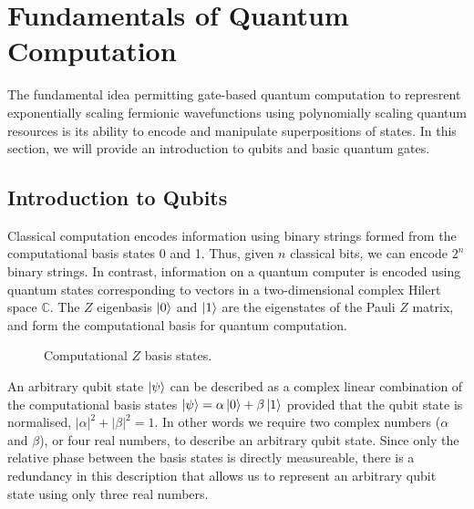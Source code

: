 \section{Fundamentals of Quantum Computation}%
\label{quantum-computation}

The fundamental idea permitting gate-based quantum computation to represrent exponentially scaling fermionic wavefunctions using polynomially scaling quantum resources is its ability to encode and manipulate superpositions of states. In this section, we will provide an introduction to qubits and basic quantum gates.

\subsection{Introduction to Qubits}

Classical computation encodes information using binary strings formed from the computational basis states 0 and 1. Thus, given $n$ classical bits, we can encode $2^n$ binary strings. In contrast, information on a quantum computer is encoded using quantum states corresponding to vectors in a two-dimensional complex Hilert space $\mathbb{C}$. The $Z$ eigenbasis $\ket 0$ and $\ket 1$ are the eigenstates of the Pauli $Z$ matrix, and form the computational basis for quantum computation.

\begin{figure}[H]
    \centering
    \begin{minipage}{.45\textwidth}
        \centering
    \end{minipage}%
    \begin{minipage}{0.45\textwidth}
        \centering
    \end{minipage}
    \caption{Computational $Z$ basis states.}
    \label{z-eigenstates}
\end{figure}

An arbitrary qubit state $\ket\psi$ can be described as a complex linear combination of the computational basis states $\ket\psi = \alpha\ket 0 + \beta\ket 1$ provided that the qubit state is normalised, $|\alpha|^2 + |\beta|^2 = 1$. In other words we require two complex numbers ($\alpha$ and $\beta$), or four real numbers, to describe an arbitrary qubit state. Since only the relative phase between the basis states is directly measureable, there is a redundancy in this description that allows us to represent an arbitrary qubit state using only three real numbers.

